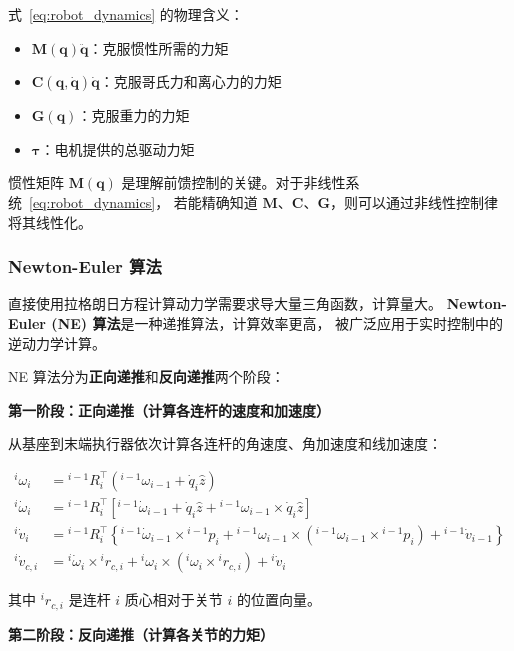 \documentclass[12pt,a4paper,oneside]{article}
\numberwithin{equation}{section}
\newcommand{\bb}[1]{\mathbf{#1}}
\begin{document}
式~\eqref{eq:robot_dynamics} 的物理含义：
\begin{itemize}
    \item $\bb{M}(\bb{q})\ddot{\bb{q}}$：克服惯性所需的力矩
    \item $\bb{C}(\bb{q},\dot{\bb{q}})\dot{\bb{q}}$：克服哥氏力和离心力的力矩
    \item $\bb{G}(\bb{q})$：克服重力的力矩
    \item $\bb{\tau}$：电机提供的总驱动力矩
\end{itemize}

惯性矩阵 $\bb{M}(\bb{q})$ 是理解前馈控制的关键。对于非线性系统~\eqref{eq:robot_dynamics}，
若能精确知道 $\bb{M}$、$\bb{C}$、$\bb{G}$，则可以通过非线性控制律将其线性化。

\subsubsection{Newton-Euler 算法}

直接使用拉格朗日方程计算动力学需要求导大量三角函数，计算量大。
\textbf{Newton-Euler (NE) 算法}是一种递推算法，计算效率更高，
被广泛应用于实时控制中的逆动力学计算。

NE 算法分为\textbf{正向递推}和\textbf{反向递推}两个阶段：

\textbf{第一阶段：正向递推（计算各连杆的速度和加速度）}

从基座到末端执行器依次计算各连杆的角速度、角加速度和线加速度：

\begin{align}
    {}^{i}\omega_i &= {}^{i-1}R_i^{\top}\left({}^{i-1}\omega_{i-1} + \dot{q}_i \hat{z}\right) \\
    {}^{i}\dot{\omega}_i &= {}^{i-1}R_i^{\top}\left[{}^{i-1}\dot{\omega}_{i-1} + \dot{q}_i \hat{z} + {}^{i-1}\omega_{i-1} \times \dot{q}_i \hat{z}\right] \\
    {}^{i}\dot{v}_i &= {}^{i-1}R_i^{\top}\left\{{}^{i-1}\dot{\omega}_{i-1} \times {}^{i-1}p_i + {}^{i-1}\omega_{i-1} \times \left({}^{i-1}\omega_{i-1} \times {}^{i-1}p_i\right) + {}^{i-1}\dot{v}_{i-1}\right\} \\
    {}^{i}\dot{v}_{c,i} &= {}^{i}\dot{\omega}_i \times {}^{i}r_{c,i} + {}^{i}\omega_i \times \left({}^{i}\omega_i \times {}^{i}r_{c,i}\right) + {}^{i}\dot{v}_i
\end{align}

其中 ${}^{i}r_{c,i}$ 是连杆 $i$ 质心相对于关节 $i$ 的位置向量。

\textbf{第二阶段：反向递推（计算各关节的力矩）}
\end{document}
